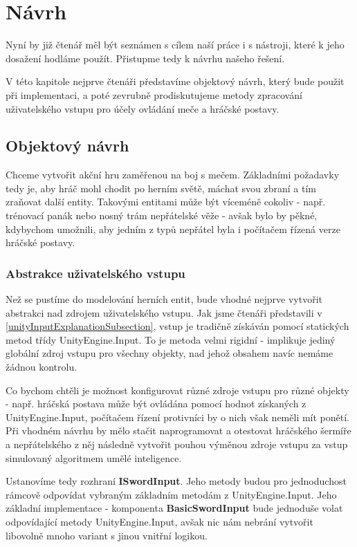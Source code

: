 \chapter{Návrh}

Nyní by již čtenář měl být seznámen s cílem naší práce i s nástroji, které k jeho dosažení hodláme použít. Přistupme tedy k návrhu našeho řešení.

V této kapitole nejprve čtenáři představíme objektový návrh, který bude použit při implementaci, a poté zevrubně prodiskutujeme metody zpracování uživatelského vstupu pro účely ovládání meče a hráčské postavy.


\section{Objektový návrh}

Chceme vytvořit akční hru zaměřenou na boj s mečem. Základními požadavky tedy je, aby hráč mohl chodit po herním světě, máchat svou zbraní a tím zraňovat další entity. Takovými entitami může být víceméně cokoliv - např. trénovací panák nebo nosný trám nepřátelské věže - avšak bylo by pěkné, kdybychom umožnili, aby jedním z typů nepřátel byla i počítačem řízená verze hráčské postavy.


\subsection{Abstrakce uživatelského vstupu}

Než se pustíme do modelování herních entit, bude vhodné nejprve vytvořit abstrakci nad zdrojem uživatelského vstupu. Jak jsme čtenáři představili v \ref{unityInputExplanationSubsection}, vstup je tradičně získáván pomocí statických metod třídy UnityEngine.Input. To je metoda velmi rigidní - implikuje jediný globální zdroj vstupu pro všechny objekty, nad jehož obsahem navíc nemáme žádnou kontrolu. 

Co bychom chtěli je možnost konfigurovat různé zdroje vstupu pro různé objekty - např. hráčská postava může být ovládána pomocí hodnot získaných z UnityEngine.Input, počítačem řízení protivníci by o nich však neměli mít ponětí. Při vhodném návrhu by mělo stačit naprogramovat a otestovat hráčského šermíře a nepřátelského z něj následně vytvořit pouhou výměnou zdroje vstupu za vstup simulovaný algoritmem umělé inteligence.

Ustanovíme tedy rozhraní \textbf{ISwordInput}. Jeho metody budou pro jednoduchost rámcově odpovídat vybraným základním metodám z UnityEngine.Input. Jeho základní implementace - komponenta \textbf{BasicSwordInput} bude jednoduše volat odpovídající metody UnityEngine.Input, avšak nic nám nebrání vytvořit libovolně mnoho variant s jinou vnitřní logikou. 

